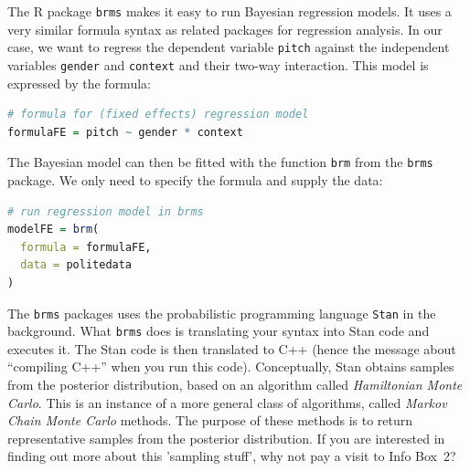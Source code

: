 \documentclass[nobib]{tufte-handout}
\begin{document}
The R package \texttt{brms} \citep{buerkner2016brms} makes it easy to run Bayesian regression models. It uses a very similar formula syntax as related packages for regression analysis. In our case, we want to regress the dependent variable \texttt{pitch} against the independent variables \texttt{gender} and \texttt{context} and their two-way interaction. This model is expressed by the formula:

\begin{minipage}[]{\textwidth}
\begin{lstlisting}[language=R]
# formula for (fixed effects) regression model
formulaFE = pitch ~ gender * context
\end{lstlisting}
\end{minipage}

The Bayesian model can then be fitted with the function \texttt{brm} from the \texttt{brms} package. We only need to specify the formula and supply the data:

\begin{minipage}[]{\textwidth}
\begin{lstlisting}[language=R]
# run regression model in brms
modelFE = brm(
  formula = formulaFE,
  data = politedata
)
\end{lstlisting}
\end{minipage}

\noindent The \texttt{brms} packages uses the probabilistic programming language \texttt{Stan}
in the background. What \texttt{brms} does is translating your syntax into Stan code and
executes it. The Stan code  is then translated to C++ (hence the message about ``compiling
C++'' when you run this code). Conceptually, Stan obtains samples from the posterior
distribution, based on an algorithm called \emph{Hamiltonian Monte Carlo}. This is an instance
of a more general class of algorithms, called \emph{Markov Chain Monte Carlo} methods. The
purpose of these methods is to return representative samples from the posterior distribution.
If you are interested in finding out more about this 'sampling stuff', why not pay a visit to Info Box~2?
\end{document}
